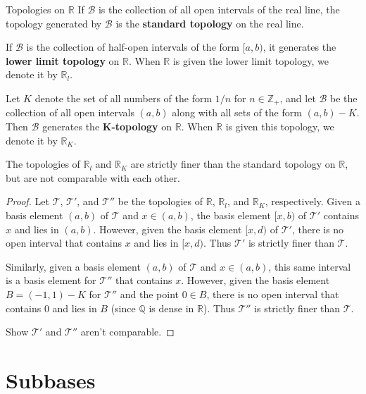 \documentclass[10pt]{report}
\begin{document}
\begin{defn}{Topologies on $\mathbb{R}$}{}
If $\mathcal{B}$ is the collection of all open intervals of the real line, the topology generated by $\mathcal{B}$ is the \textbf{standard topology} on the real line.

If $\mathcal{B}$ is the collection of half-open intervals of the form $[a,b)$, it generates the \textbf{lower limit topology} on $\mathbb{R}$. When $\mathbb{R}$ is given the lower limit topology, we denote it by $\mathbb{R}_l$.

Let $K$ denote the set of all numbers of the form $1/n$ for $n \in \mathbb{Z}_+$, and let $\mathcal{B}$ be the collection of all open intervals $(a,b)$ along with all sets of the form $(a,b) - K$. Then $\mathcal{B}$ generates the \textbf{K-topology} on $\mathbb{R}$. When $\mathbb{R}$ is given this topology, we denote it by $\mathbb{R}_K$.
\end{defn}

\begin{prop}
	The topologies of $\mathbb{R}_l$ and $\mathbb{R}_K$ are strictly finer than the standard topology on $\mathbb{R}$, but are not comparable with each other.
\end{prop}
\begin{proof}
	Let $\mathcal{T}$, $\mathcal{T}'$, and $\mathcal{T}''$ be the topologies of $\mathbb{R}$, $\mathbb{R}_l$, and $\mathbb{R}_K$, respectively. Given a basis element $(a,b)$ of $\mathcal{T}$ and $x \in (a,b)$, the basis element $[x,b)$ of $\mathcal{T}'$ contains $x$ and lies in $(a,b)$. However, given the basis element $[x,d)$ of $\mathcal{T}'$, there is no open interval that contains $x$ and lies in $[x,d)$. Thus $\mathcal{T}'$ is strictly finer than $\mathcal{T}$.

	Similarly, given a basis element $(a,b)$ of $\mathcal{T}$ and $x \in (a,b)$, this same interval is a basis element for $\mathcal{T}''$ that contains $x$. However, given the basis element $B=(-1,1) - K$ for $\mathcal{T}''$ and the point $0 \in B$, there is no open interval that contains $0$ and lies in $B$ (since $\mathbb{Q}$ is dense in $\mathbb{R}$). Thus $\mathcal{T}''$ is strictly finer than $\mathcal{T}$.

	{\color{red}Show $\mathcal{T}'$ and $\mathcal{T}''$ aren't comparable.}
\end{proof}


\section{Subbases}
\end{document}
